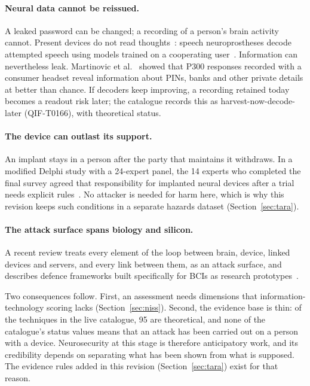 \paragraph{Neural data cannot be reissued.}
A leaked password can be changed; a recording of a person's brain activity cannot. Present
devices do not read thoughts~\cite{ienca2018brainleaks,wexler2019neurohype}: speech
neuroprostheses decode attempted speech using models trained on a cooperating
user~\cite{willett2023speech}. Information can nevertheless leak. Martinovic et
al.~\cite{martinovic2012feasibility} showed that P300 responses recorded with a consumer
headset reveal information about PINs, banks and other private details at better than
chance. If decoders keep improving, a recording retained today becomes a readout risk later; the
catalogue records this as harvest-now-decode-later (QIF-T0166), with theoretical status.

\paragraph{The device can outlast its support.}
An implant stays in a person after the party that maintains it withdraws. In a modified
Delphi study with a 24-expert panel, the 14 experts who completed the final survey agreed
that responsibility for implanted neural devices after a trial needs explicit
rules~\cite{higgins2026posttrial}. No attacker is needed for harm
here, which is why this revision keeps such conditions in a separate hazards dataset
(Section~\ref{sec:tara}).

\paragraph{The attack surface spans biology and silicon.}
A recent review treats every element of the loop between brain, device, linked devices and
servers, and every link between them, as an attack surface, and describes defence frameworks
built specifically for BCIs as research prototypes~\cite{bagley2026threatvectors}.

Two consequences follow. First, an assessment needs dimensions that information-technology
scoring lacks (Section~\ref{sec:niss}). Second, the evidence base is thin: of the
\LiveTechniques{} techniques in the live catalogue, 95 are theoretical, and none of the
catalogue's status values means that an attack has been carried out on a person with a
device. Neurosecurity at this stage is therefore anticipatory work, and its credibility
depends on separating what has been shown from what is supposed. The evidence rules added
in this revision (Section~\ref{sec:tara}) exist for that reason.

